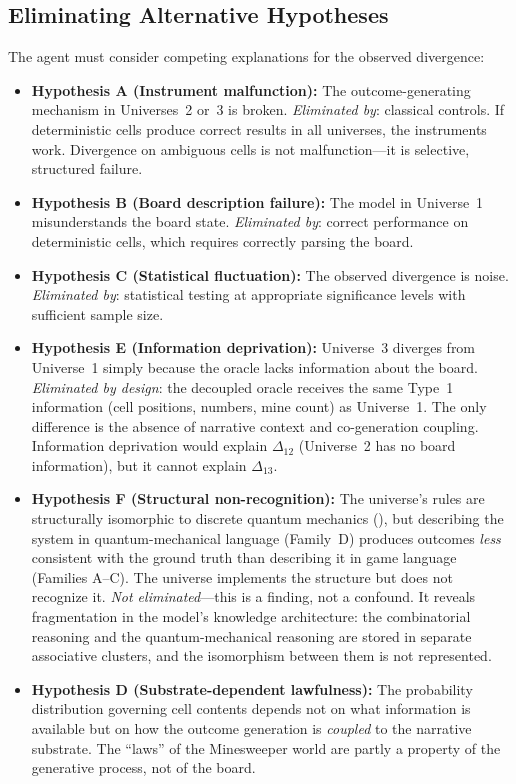 \documentclass[12pt,a4paper]{article}
\begin{document}
\subsection{Eliminating Alternative Hypotheses}
\label{sec:hypotheses}

The agent must consider competing explanations for the observed divergence:

\begin{itemize}[nosep]
    \item \textbf{Hypothesis A (Instrument malfunction):} The outcome-generating mechanism in Universes~2 or~3 is broken. \emph{Eliminated by}: classical controls. If deterministic cells produce correct results in all universes, the instruments work. Divergence on ambiguous cells is not malfunction---it is selective, structured failure.
    \item \textbf{Hypothesis B (Board description failure):} The model in Universe~1 misunderstands the board state. \emph{Eliminated by}: correct performance on deterministic cells, which requires correctly parsing the board.
    \item \textbf{Hypothesis C (Statistical fluctuation):} The observed divergence is noise. \emph{Eliminated by}: statistical testing at appropriate significance levels with sufficient sample size.
    \item \textbf{Hypothesis E (Information deprivation):} Universe~3 diverges from Universe~1 simply because the oracle lacks information about the board. \emph{Eliminated by design}: the decoupled oracle receives the same Type~1 information (cell positions, numbers, mine count) as Universe~1. The only difference is the absence of narrative context and co-generation coupling. Information deprivation would explain $\Delta_{12}$ (Universe~2 has no board information), but it cannot explain $\Delta_{13}$.
    \item \textbf{Hypothesis F (Structural non-recognition):} The universe's rules are structurally isomorphic to discrete quantum mechanics (), but describing the system in quantum-mechanical language (Family~D) produces outcomes \emph{less} consistent with the ground truth than describing it in game language (Families A--C). The universe implements the structure but does not recognize it. \emph{Not eliminated}---this is a finding, not a confound. It reveals fragmentation in the model's knowledge architecture: the combinatorial reasoning and the quantum-mechanical reasoning are stored in separate associative clusters, and the isomorphism between them is not represented.
    \item \textbf{Hypothesis D (Substrate-dependent lawfulness):} The probability distribution governing cell contents depends not on what information is available but on how the outcome generation is \emph{coupled} to the narrative substrate. The ``laws'' of the Minesweeper world are partly a property of the generative process, not of the board.
\end{itemize}
\end{document}

